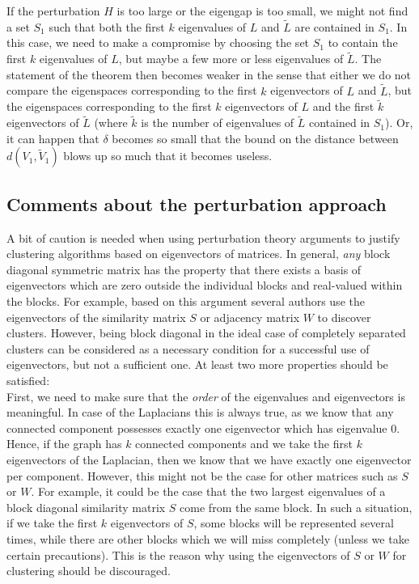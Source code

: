 \documentclass{article}
\newcommand{\Lun}{L}
\begin{document}
If the perturbation $H$ is too large or the eigengap is too small, we
might not find a set $S_1$ such that both the first $k$ eigenvalues of
$\Lun$ and $\tilde \Lun$ are contained in $S_1$. In this case, we need
to make a compromise by choosing the set $S_1$ to contain the first
$k$ eigenvalues of $\Lun$, but maybe a few more or less eigenvalues
of $\tilde \Lun$. The statement of the theorem then becomes weaker in
the sense that either we do not compare the eigenspaces corresponding
to the first $k$ eigenvectors of $L$ and $\tilde L$, but the
eigenspaces corresponding to the first $k$ eigenvectors of $L$ and the
first $\tilde k$ eigenvectors of $\tilde L$ (where $\tilde k$ is the
number of eigenvalues of $\tilde L$ contained in $S_1$). Or, it
can happen that $\delta$ becomes so small that the bound on the
distance between $d(V_1, \tilde V_1)$ blows up so much that it becomes useless. 

%
\subsection{Comments about the perturbation approach}
%




A bit of caution is needed when using perturbation theory arguments to
justify clustering algorithms based on eigenvectors of matrices. In
general, {\em any} block diagonal symmetric matrix has the property that
there exists a basis of eigenvectors which are zero outside the
individual blocks and real-valued within the blocks. For example,
based on this argument several authors use the eigenvectors of the
similarity matrix $S$ or adjacency matrix $W$ to discover
clusters.
%
However, being block diagonal in the ideal case of completely
separated clusters can be considered as a necessary condition for a
successful use of eigenvectors, but not a sufficient one. 
At least two more properties should be satisfied: \\


First, we need to make sure that the {\em order} of the eigenvalues
and eigenvectors is meaningful. In case of the Laplacians this is
always true, as we know that any connected component possesses exactly
one eigenvector which has eigenvalue 0. Hence, if the graph has $k$
connected components and we take the first $k$ eigenvectors of the
Laplacian, then we know that we have exactly one eigenvector per
component. However, this might not be the case for other matrices such
as $S$ or $W$. For example, it could be the case that the two largest
eigenvalues of a block diagonal similarity matrix $S$ come from the
same block.  In such a situation, if we take the first $k$
eigenvectors of $S$, some blocks will be represented several times,
while there are other blocks which we will miss completely (unless we
take certain precautions). This is the reason why using the
eigenvectors of
$S$ or $W$ for clustering should be discouraged.\\
\end{document}
